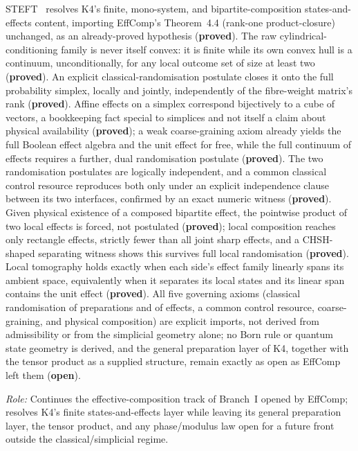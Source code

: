 \documentclass[11pt,a4paper]{article}
\newcommand{\sproved}{\textcolor{cproved}{\textbf{proved}}}
\newcommand{\sopen}{\textcolor{copen}{\textbf{open}}}
\begin{document}
    STEFT~\cite{Beau2026steft} resolves K4's finite, mono-system, and bipartite-composition
    states-and-effects content, importing EffComp's Theorem~4.4 (rank-one product-closure) unchanged, as an
    already-proved hypothesis (\sproved).
    The raw cylindrical-conditioning family is never itself convex: it is finite while its own convex hull
    is a continuum, unconditionally, for any local outcome set of size at least two (\sproved).
    An explicit classical-randomisation postulate closes it onto the full probability simplex, locally and
    jointly, independently of the fibre-weight matrix's rank (\sproved).
    Affine effects on a simplex correspond bijectively to a cube of vectors, a bookkeeping fact special to
    simplices and not itself a claim about physical availability (\sproved); a weak coarse-graining axiom
    already yields the full Boolean effect algebra and the unit effect for free, while the full continuum of
    effects requires a further, dual randomisation postulate (\sproved).
    The two randomisation postulates are logically independent, and a common classical control resource
    reproduces both only under an explicit independence clause between its two interfaces, confirmed by an
    exact numeric witness (\sproved).
    Given physical existence of a composed bipartite effect, the pointwise product of two local effects is
    forced, not postulated (\sproved); local composition reaches only rectangle effects, strictly fewer
    than all joint sharp effects, and a CHSH-shaped separating witness shows this survives full local
    randomisation (\sproved).
    Local tomography holds exactly when each side's effect family linearly spans its ambient space,
    equivalently when it separates its local states and its linear span contains the unit effect (\sproved).
    All five governing axioms (classical randomisation of preparations and of effects, a common control
    resource, coarse-graining, and physical composition) are explicit imports, not derived from
    admissibility or from the simplicial geometry alone; no Born rule or quantum state geometry is derived,
    and the general preparation layer of K4, together with the tensor product as a supplied structure,
    remain exactly as open as EffComp left them (\sopen).

    \textit{Role:} Continues the effective-composition track of Branch~I opened by EffComp; resolves K4's
    finite states-and-effects layer while leaving its general preparation layer, the tensor product, and any
    phase/modulus law open for a future front outside the classical/simplicial regime.
\end{document}
